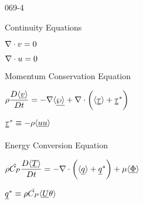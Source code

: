 \begin{mitframe}{069-4}

\begin{listone}

\item Continuity Equations
	   \begin{listtwo}
       
       \item $\nabla\cdot\vvel=0$
       \item $\nabla\cdot\forcepot=0$
  
		\end{listtwo}

\item Momentum Conservation Equation

			\begin{listtwo}
          
            \item $\dens\dfrac{\elecdisplace\langle\uline{\vvel}\rangle}{\elecdisplace{t}}=-\nabla\langle\uline{\dynpress\rangle}+\nabla\cdot\bigg(\langle\uuline{\torque}\rangle+\uuline{\torque}^*\bigg)$
							
                            \begin{listthree}
                            
                            \item $\uuline{\torque}^*\equiv-\dens\langle\uline{\forcepot}\uline{\forcepot}\rangle$
                            
                            \end{listthree}
		
				\end{listtwo}

\item Energy Conversion Equation

			\begin{listtwo}
            \item $\dens\hat{\cp}\dfrac{\elecdisplace\langle\uline\Temp\rangle}{\elecdisplace{t}}=-\nabla\cdot\bigg(\langle\uline{\heatflux}\rangle+\uline{\heatflux}^*\bigg)+\chempot\langle\uline\diss\rangle$
            
            		\begin{listthree}
                    
                    \item $\uline{\heatflux}^*\equiv\dens\hat{\cp}\langle\uline{\uvel}\theta\rangle$
                   

\end{listthree}
\end{listtwo}
\end{listone}
\end{mitframe}
